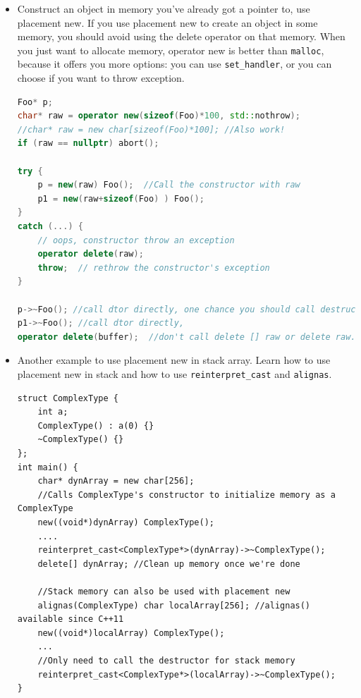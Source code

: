 \documentclass[a4paper,11pt,twoside]{book}
\begin{document}
\begin{itemize}
	\item Construct an object in memory you've already got a pointer to, use placement new. If you use placement new to create an object in some memory, you should avoid using the delete operator on that memory. When you just want to allocate memory, operator new is better than \texttt{malloc}, because it offers you more options: you can use \texttt{set\_handler}, or you can choose if you want to throw exception.
\begin{lstlisting}[frame=single, language=c++]
Foo* p;
char* raw = operator new(sizeof(Foo)*100, std::nothrow);
//char* raw = new char[sizeof(Foo)*100]; //Also work!
if (raw == nullptr) abort();
	
try {
	p = new(raw) Foo();  //Call the constructor with raw
	p1 = new(raw+sizeof(Foo) ) Foo();
}
catch (...) {
	// oops, constructor throw an exception
	operator delete(raw);
	throw;  // rethrow the constructor's exception
}

p->~Foo(); //call dtor directly, one chance you should call destructor directly.
p1->~Foo(); //call dtor directly,
operator delete(buffer);  //don't call delete [] raw or delete raw.
\end{lstlisting}
	
	\item Another example to use placement new in stack array. Learn how to use placement new in stack and how to use \texttt{reinterpret\_cast} and \texttt{alignas}.
\begin{lstlisting}[numbers=none]
struct ComplexType {
	int a;
	ComplexType() : a(0) {}
	~ComplexType() {}
};
int main() {
	char* dynArray = new char[256];
	//Calls ComplexType's constructor to initialize memory as a ComplexType
	new((void*)dynArray) ComplexType();
	....
	reinterpret_cast<ComplexType*>(dynArray)->~ComplexType();
	delete[] dynArray; //Clean up memory once we're done
	
	//Stack memory can also be used with placement new
	alignas(ComplexType) char localArray[256]; //alignas() available since C++11
	new((void*)localArray) ComplexType();
	...
	//Only need to call the destructor for stack memory
	reinterpret_cast<ComplexType*>(localArray)->~ComplexType();
}
\end{lstlisting}

\end{itemize}
\end{document}
